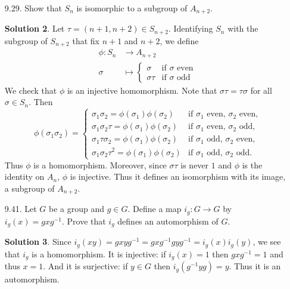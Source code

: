 \documentclass{article}
\theoremstyle{definition}
\newtheorem*{solution}{Solution}
\begin{document}
\begin{enumerate}
\begin{solution}
Note that the assertion is true if $K$ is finite, but it's difficult to show.  Many people tried to used an isomorphism $\phi : G \times K \to H \times K$ to construct an isomorphism $G \to H$.  The difficulty is that $\phi$ does not necessarily map $G \times \{1\}$ to $H \times \{1\}$ (and if it does, it may not be surjective).
\end{solution}
\item[9.29.] Show that $S_n$ is isomorphic to a subgroup of $A_{n+2}$.
\begin{solution}
Let $\tau = (n+1, n+2) \in S_{n+2}$.  Identifying $S_n$ with the subgroup of $S_{n+2}$ that fix $n+1$ and $n+2$, we define
\begin{align*}
\phi : S_n &\to A_{n+2} \\
\sigma &\mapsto \begin{cases} \sigma & \mbox{if $\sigma$ even} \\
\sigma \tau & \mbox{if $\sigma$ odd} \end{cases}
\end{align*}
We check that $\phi$ is an injective homomorphism.  Note that $\sigma \tau = \tau \sigma$ for all $\sigma \in S_n$.  Then
\[
\phi(\sigma_1 \sigma_2) = \begin{cases}
\sigma_1 \sigma_2 = \phi(\sigma_1)\phi(\sigma_2) & \mbox{if $\sigma_1$ even, $\sigma_2$ even,} \\
\sigma_1 \sigma_2 \tau = \phi(\sigma_1)\phi(\sigma_2) & \mbox{if $\sigma_1$ even, $\sigma_2$ odd,} \\
\sigma_1 \tau \sigma_2 = \phi(\sigma_1)\phi(\sigma_2) & \mbox{if $\sigma_1$ odd, $\sigma_2$ even,} \\
\sigma_1 \sigma_2 \tau^2 = \phi(\sigma_1)\phi(\sigma_2) & \mbox{if $\sigma_1$ odd, $\sigma_2$ odd.}
\end{cases}
\]
Thus $\phi$ is a homomorphism.  Moreover, since $\sigma \tau$ is never $1$ and $\phi$ is the identity on $A_n$, $\phi$ is injective.  Thus it defines an isomorphism with its image, a subgroup of $A_{n+2}$.
\end{solution}
\item[9.41.] Let $G$ be a group and $g \in G$. Define a map $i_g : G \to G$ by $i_g(x) = gxg^{-1}$. Prove that $i_g$ defines an automorphism of $G$.
\begin{solution}
Since $i_g(xy) = gxyg^{-1} = gxg^{-1}gyg^{-1} = i_g(x)i_g(y)$, we see that $i_g$ is a homomorphism.  It is injective: if $i_g(x) = 1$ then $gxg^{-1} = 1$ and thus $x = 1$.  And it is surjective: if $y \in G$ then $i_g(g^{-1}yg) = y$.  Thus it is an automorphism.

\end{solution}
\end{enumerate}
\end{document}
